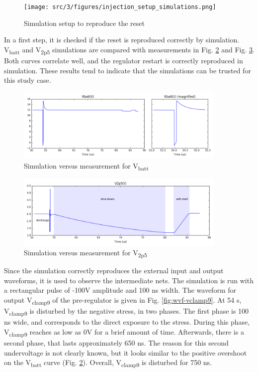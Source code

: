 \begin{figure}[!h]
  \centering
  \texttt{[image: src/3/figures/injection\_setup\_simulations.png]}
  \caption{Simulation setup to reproduce the reset}
  \label{fig:sim-setup-reset}
\end{figure}

In a first step, it is checked if the reset is reproduced correctly by simulation.
V\textsubscript{batt} and V\textsubscript{2p5} simulations are compared with measurements in Fig. \ref{fig:wvf-vbatt} and Fig. \ref{fig:wvf-v2p5}.
Both curves correlate well, and the regulator restart is correctly reproduced in simulation.
These results tend to indicate that the simulations can be trusted for this study case.

\begin{figure}[!h]
  \centering
  \includegraphics[width=0.9\textwidth]{src/3/figures/vbatt.png}
  \caption{Simulation versus measurement for V\textsubscript{batt}}
  \label{fig:wvf-vbatt}
\end{figure}

\begin{figure}[!h]
  \centering
  \includegraphics[width=0.9\textwidth]{src/3/figures/v2p5.png}
  \caption{Simulation versus measurement for V\textsubscript{2p5}}
  \label{fig:wvf-v2p5}
\end{figure}

Since the simulation correctly reproduces the external input and output waveforms, it is used to observe the intermediate nets.
The simulation is run with a rectangular pulse of -100V amplitude and 100 ns width.
The waveform for output V\textsubscript{clamp9} of the pre-regulator is given in Fig. \ref{fig:wvf-vclamp9}.
At 54 \textmugreek{}s,  V\textsubscript{clamp9} is disturbed by the negative stress, in two phases.
The first phase is 100 ns wide, and corresponds to the direct exposure to the stress.
During this phase, V\textsubscript{clamp9} reaches as low as 0V for a brief amount of time.
Afterwards, there is a second phase, that lasts approximately 650 ns.
The reason for this second undervoltage is not clearly known, but it looks similar to the positive overshoot on the  V\textsubscript{batt} curve (Fig. \ref{fig:wvf-vbatt}).
Overall, V\textsubscript{clamp9} is disturbed for 750 ns.

